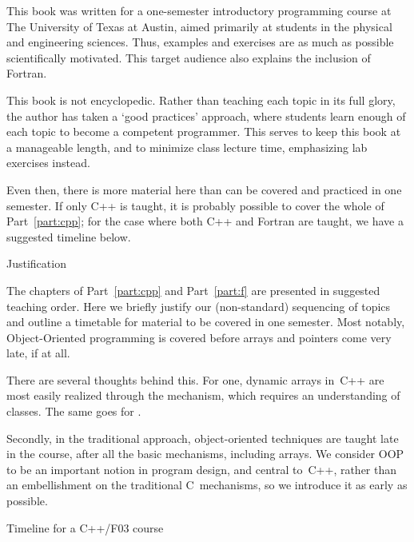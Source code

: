 
This book was written for a one-semester introductory programming course at The
University of Texas at Austin, aimed primarily at students in the
physical and engineering sciences. Thus, examples and exercises are as
much as possible scientifically motivated. This target audience also
explains the inclusion of Fortran.

This book is not encyclopedic. Rather than teaching each topic in its
full glory,
the author has taken a `good practices' approach, where students learn
enough of each topic to become a competent programmer. This serves to
keep this book at a manageable length, and to minimize class lecture
time, emphasizing lab exercises instead.

Even then, there is more material here than can be covered and
practiced in one semester. If only C++ is taught, it is probably
possible to cover the whole of Part~\ref{part:cpp}; for the case where
both C++ and Fortran are taught, we have a suggested timeline below.

 {Justification}

The chapters of Part~\ref{part:cpp} and Part~\ref{part:f} are
presented in suggested teaching order. 
Here we briefly justify our (non-standard) sequencing of topics and
outline a timetable for material to be covered in one semester.
Most notably, Object-Oriented programming is covered
before arrays and pointers come very late, if at all.

There are several thoughts behind this. For one, dynamic arrays in~C++
are most easily realized through the  mechanism, which
requires an understanding of classes. The same goes for
.

Secondly, in the traditional approach, object-oriented techniques are
taught late in the course, after all the basic mechanisms, including
arrays. We consider OOP to be an important notion in program design,
and central to~C++, rather than an embellishment on the traditional
C~mechanisms, so we introduce it as early as possible.

 {Timeline for a C++/F03 course}

